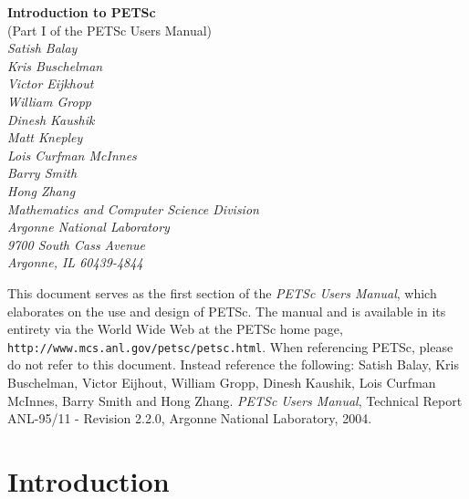 \documentclass[twoside,12pt]{../sty/report_petsc}
\begin{document}
\begin{center}
$\!$
\vspace{1.0cm}
\thispagestyle{empty}

{\huge \bf Introduction to PETSc}\\ 
\vspace{0.5cm}
{\LARGE (Part I of the PETSc Users Manual)} \\
\vspace{1.5cm}
{\large \em Satish Balay\\Kris Buschelman\\Victor Eijkhout\\William Gropp\\Dinesh Kaushik\\Matt Knepley\\Lois Curfman McInnes\\Barry Smith\\Hong Zhang\\
\medskip \medskip
Mathematics and Computer Science Division\\
Argonne National Laboratory\\
9700 South Cass Avenue\\
Argonne, IL 60439-4844\\
}
\end{center}

\vspace{1.0cm}



 This document serves as the first section of the {\em PETSc Users
Manual}, which elaborates on the use and design of PETSc. The
manual and is available in its entirety via the World Wide Web at
the PETSc home page, {\tt http://www.mcs.anl.gov/petsc/petsc.html}.
When referencing PETSc, please do 
not refer to this document. Instead reference the following: Satish
Balay, Kris Buschelman, Victor Eijhout, William Gropp, Dinesh Kaushik, 
Lois Curfman McInnes, Barry Smith and Hong Zhang.  {\em
PETSc Users Manual}, Technical Report ANL-95/11 - Revision 2.2.0,
Argonne National Laboratory, 2004.

%
\newpage


\newpage
\section{Introduction}

\end{document}
